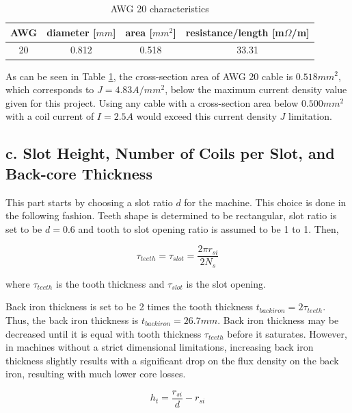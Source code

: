 \documentclass[a4paper, 11pt, titlepage]{article}
\begin{document}
\begin{table}[h]
	\begin{center}
		\begin{tabular}{c|c|c|c}
			AWG & diameter [$mm$] & area [$mm^2$] & resistance/length [m$\Omega$/m] \\
			\hline
			20 &  0.812 & 0.518 & 33.31 \\
			\hline
		\end{tabular}
	\end{center}
	\caption{AWG 20 characteristics}
	\label{tab:AWG20}
\end{table}


As can be seen in Table \ref{tab:AWG20}, the cross-section area of AWG 20 cable is $0.518mm^2$, which corresponds to $J=4.83A/mm^2$, below the maximum current density value given for this project. Using any cable with a cross-section area below $0.500mm^2$ with a coil current of $I=2.5A$ would exceed this current density $J$ limitation.


\subsection{c. Slot Height, Number of Coils per Slot, and Back-core Thickness}

This part starts by choosing a slot ratio $d$ for the machine. This choice is done in the following fashion. Teeth shape is determined to be rectangular, slot ratio is set to be $d=0.6$ and tooth to slot opening ratio is assumed to be 1 to 1. Then, 

\begin{equation}
	\tau_{teeth} = \tau_{slot} = \frac{2\pi r_{si}}{2N_s}
\end{equation}

where $\tau_{teeth}$ is the tooth thickness and $\tau_{slot}$ is the slot opening.

Back iron thickness is set to be 2 times the tooth thickness $t_{back iron}=2\tau_{teeth}$. Thus, the back iron thickness is $t_{back iron}=26.7mm$. Back iron thickness may be decreased until it is equal with tooth thickness $\tau_{teeth}$ before it saturates. However, in machines without a strict dimensional limitations, increasing back iron thickness slightly results with a significant drop on the flux density on the back iron, resulting with much lower core losses.

\begin{equation}
	h_t = \frac{r_{si}}{d}-r_{si}
\end{equation}
\end{document}
